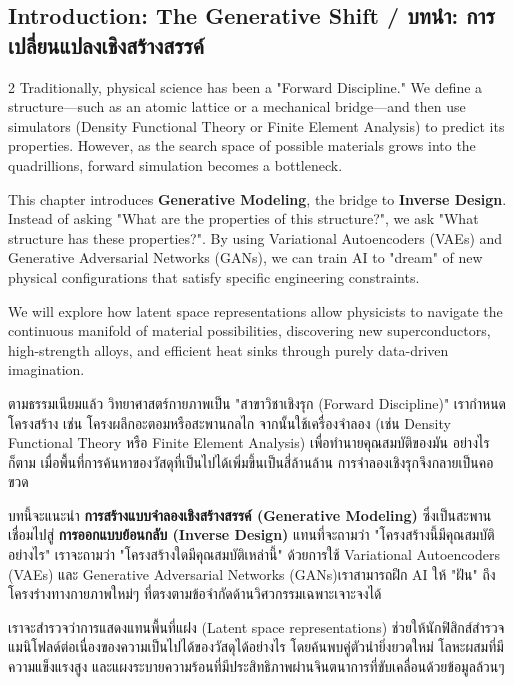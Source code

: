 \subsection{Introduction: The Generative Shift \quad / \quad \textthai{บทนำ: การเปลี่ยนแปลงเชิงสร้างสรรค์}}
\begin{paracol}{2}
Traditionally, physical science has been a "Forward Discipline." We define a structure—such as an atomic lattice or a mechanical bridge—and then use simulators (Density Functional Theory or Finite Element Analysis) to predict its properties. However, as the search space of possible materials grows into the quadrillions, forward simulation becomes a bottleneck.

This chapter introduces \textbf{Generative Modeling}, the bridge to \textbf{Inverse Design}. Instead of asking "What are the properties of this structure?", we ask "What structure has these properties?". By using Variational Autoencoders (VAEs) and Generative Adversarial Networks (GANs), we can train AI to "dream" of new physical configurations that satisfy specific engineering constraints.

We will explore how latent space representations allow physicists to navigate the continuous manifold of material possibilities, discovering new superconductors, high-strength alloys, and efficient heat sinks through purely data-driven imagination.

\switchcolumn

\begin{thai}
ตามธรรมเนียมแล้ว วิทยาศาสตร์กายภาพเป็น "สาขาวิชาเชิงรุก (Forward Discipline)" เรากำหนดโครงสร้าง เช่น โครงผลึกอะตอมหรือสะพานกลไก จากนั้นใช้เครื่องจำลอง (เช่น Density Functional Theory หรือ Finite Element Analysis) เพื่อทำนายคุณสมบัติของมัน อย่างไรก็ตาม เมื่อพื้นที่การค้นหาของวัสดุที่เป็นไปได้เพิ่มขึ้นเป็นสี่ล้านล้าน การจำลองเชิงรุกจึงกลายเป็นคอขวด

บทนี้จะแนะนำ \textbf{การสร้างแบบจำลองเชิงสร้างสรรค์ (Generative Modeling)} ซึ่งเป็นสะพานเชื่อมไปสู่ \textbf{การออกแบบย้อนกลับ (Inverse Design)} แทนที่จะถามว่า "โครงสร้างนี้มีคุณสมบัติอย่างไร" เราจะถามว่า "โครงสร้างใดมีคุณสมบัติเหล่านี้" ด้วยการใช้ Variational Autoencoders (VAEs) และ Generative Adversarial Networks (GANs)เราสามารถฝึก AI ให้ "ฝัน" ถึงโครงร่างทางกายภาพใหม่ๆ ที่ตรงตามข้อจำกัดด้านวิศวกรรมเฉพาะเจาะจงได้

เราจะสำรวจว่าการแสดงแทนพื้นที่แฝง (Latent space representations) ช่วยให้นักฟิสิกส์สำรวจแมนิโฟลด์ต่อเนื่องของความเป็นไปได้ของวัสดุได้อย่างไร โดยค้นพบคู่ตัวนำยิ่งยวดใหม่ โลหะผสมที่มีความแข็งแรงสูง และแผงระบายความร้อนที่มีประสิทธิภาพผ่านจินตนาการที่ขับเคลื่อนด้วยข้อมูลล้วนๆ
\end{thai}
\end{paracol}

